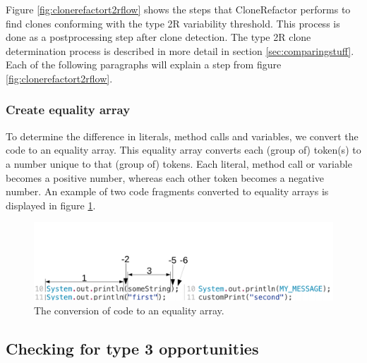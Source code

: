 Figure \ref{fig:clonerefactort2rflow} shows the steps that CloneRefactor performs to find clones conforming with the type 2R variability threshold. This process is done as a postprocessing step after clone detection. The type 2R clone determination process is described in more detail in section \ref{sec:comparingstuff}. Each of the following paragraphs will explain a step from figure \ref{fig:clonerefactort2rflow}.

\subsubsection{Create equality array}
To determine the difference in literals, method calls and variables, we convert the code to an equality array. This equality array converts each (group of) token(s) to a number unique to that (group of) tokens. Each literal, method call or variable becomes a positive number, whereas each other token becomes a negative number. An example of two code fragments converted to equality arrays is displayed in figure \ref{fig:equalityarrays}. 

\begin{figure}[H]
  \centering
  \includegraphics[width=1\columnwidth]{img/equality}
  \caption{The conversion of code to an equality array.}
  \label{fig:equalityarrays}
\end{figure}


\subsection{Checking for type 3 opportunities}
